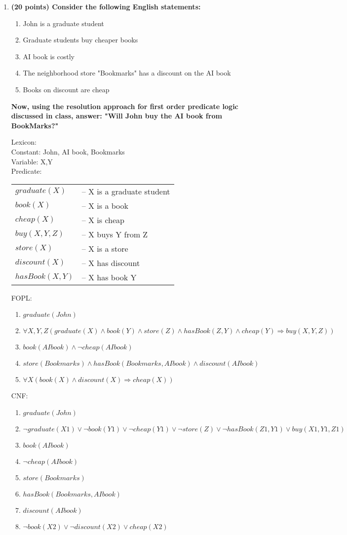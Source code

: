 \documentclass{article}%
\begin{document}
\begin{enumerate}
\item \textbf{(20 points) Consider the following English statements:}
	\begin{enumerate}
	\item John is a graduate student
	\item Graduate students buy cheaper books
	\item AI book is costly
	\item The neighborhood store "Bookmarks" has a discount on the AI book
	\item Books on discount are cheap
	\end{enumerate}

\textbf{Now, using the resolution approach for first order predicate logic discussed in class, answer: "Will John buy the AI book from BookMarks?"}

Lexicon: \\
Constant: John, AI book, Bookmarks \\
Variable: X,Y\\
Predicate: \\
\begin{tabular}{p{2.5cm}l}
 $graduate(X)$ & -- X is a graduate student \\ 
 $book(X)$ & -- X is a book  \\
 $cheap(X)$ & -- X is cheap  \\
$ buy(X,Y,Z)$ & -- X buys Y from Z\\
 $store(X)$ & -- X is a store  \\ 
 $discount(X)$ & -- X has discount  \\ 
 $ hasBook(X,Y) $ & -- X has book Y
\end{tabular} 

FOPL:
\begin{enumerate}
\item $ graduate(John) $
\item $ \forall X, Y, Z (graduate(X) \wedge book(Y) \wedge store(Z) \wedge hasBook(Z,Y)\wedge  cheap(Y)  \Rightarrow  buy(X,Y,Z)) $
\item $ book(AI book) \wedge \neg cheap(AI book) $
\item $ store(Bookmarks) \wedge hasBook(Bookmarks, AI book) \wedge discount(AI book) $
\item $ \forall X (book(X) \wedge discount(X) \Rightarrow cheap(X)) $
\end{enumerate}

CNF:
\begin{enumerate}
\item $ graduate(John) $
\item $ \neg graduate(X1) \vee \neg book(Y1) \vee \neg cheap(Y1) \vee \neg store(Z) \vee \neg hasBook(Z1,Y1) \vee buy(X1,Y1,Z1)$
\item $ book(AI book) $
\item $ \neg cheap(AI book) $
\item $ store(Bookmarks) $
\item $ hasBook(Bookmarks, AI book) $
\item $ discount(AI book) $
\item $ \neg book(X2) \vee \neg discount(X2) \vee cheap(X2) $
\end{enumerate}


\end{enumerate}
\end{document}
